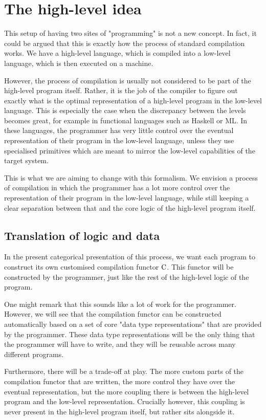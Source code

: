 \section{The high-level idea}

This setup of having two sites of "programming" is not a new concept. In fact,
it could be argued that this is exactly how the process of standard compilation
works. We have a high-level language, which is compiled into a low-level
language, which is then executed on a machine.

However, the process of compilation is usually not considered to be part of the
high-level program itself. Rather, it is the job of the compiler to figure out
exactly what is the optimal representation of a high-level program in the
low-level language. This is especially the case when the discrepancy between
the levels becomes great, for example in functional languages such as Haskell
or ML. In these languages, the programmer has very little control over the
eventual representation of their program in the low-level language, unless they
use specialised primitives which are meant to mirror the low-level capabilities
of the target system.

This is what we are aiming to change with this formalism. We envision a process
of compilation in which the programmer has a lot more control over the
representation of their program in the low-level language, while still keeping
a clear separation between that and the core logic of the high-level program
itself.

\subsection{Translation of logic and data}

In the present categorical presentation of this process, we want each program
to construct its own customised compilation functor $\mathrm C$. This functor will
be constructed by the programmer, just like the rest of the high-level logic of
the program.

One might remark that this sounds like a lot of work for the programmer.
However, we will see that the compilation functor can be constructed
automatically based on a set of core "data type representations" that are
provided by the programmer. These data type representations will be the only
thing that the programmer will have to write, and they will be reusable across
many different programs.

Furthermore, there will be a trade-off at play. The more custom parts of the
compilation functor that are written, the more control they have over the
eventual representation, but the more coupling there is between the high-level
program and the low-level representation. Crucially however, this coupling is
never present in the high-level program itself, but rather sits alongside it.


